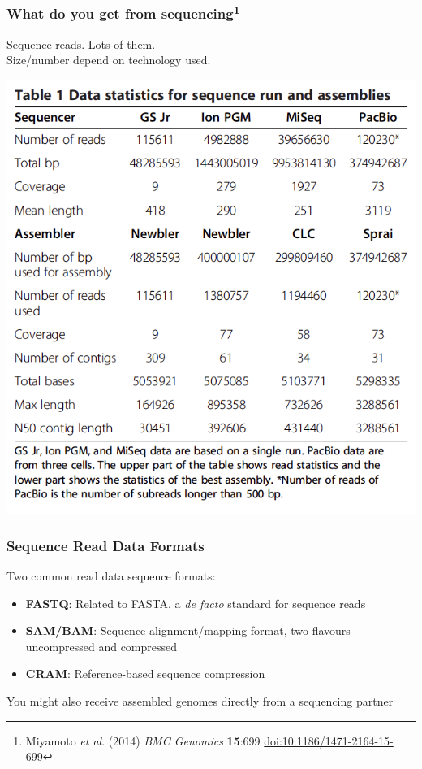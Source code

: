 
\begin{frame}
  \frametitle{What do you get from sequencing\footnote{\tiny{Miyamoto \textit{et al}. (2014) \textit{BMC Genomics} \textbf{15}:699 \href{http://dx.doi.org/10.1186/1471-2164-15-699}{doi:10.1186/1471-2164-15-699}}}}
  Sequence reads. Lots of them. \\
  Size/number depend on technology used.
    \begin{center}
      \includegraphics[height=0.7\textheight]{images/miyamoto_table}
    \end{center}   
\end{frame}

\begin{frame}
  \frametitle{Sequence Read Data Formats}
  Two common read data sequence formats:
  \begin{itemize}
    \item \textbf{FASTQ}: Related to FASTA, a \textit{de facto} standard for sequence reads
    \item \textbf{SAM/BAM}: Sequence alignment/mapping format, two flavours - uncompressed and compressed
    \item \textbf{CRAM}: Reference-based sequence compression
  \end{itemize}
  You might also receive assembled genomes directly from a sequencing partner
\end{frame}

